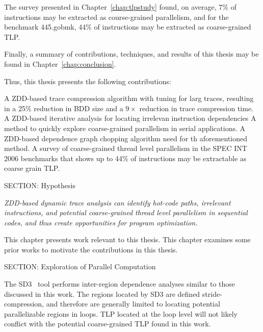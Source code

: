 {The survey presented in Chapter~\ref{chap:tlpstudy} found, on average, 7\% of instructions may be extracted as course-grained parallelism, and for the benchmark 445.gobmk, 44\% of instructions may be extracted as coarse-grained TLP.

Finally, a summary of contributions, techniques, and results of this thesis may be found in Chapter~\ref{chap:conclusion}.

Thus, this thesis presents the following contributions:

 A ZDD-based trace compression algorithm with tuning for larg
 traces, resulting in a 25\% reduction in BDD size and a $9\times$ reduction in trace compression time. A ZDD-based iterative analysis for locating irrelevan
 instruction dependencies A method to quickly explore coarse-grained parallelism in serial
 applications. A ZDD-based dependence graph chopping algorithm need for th
 aforementioned method. A survey of coarse-grained thread level parallelism in the SPEC
 INT 2006 benchmarks that shows up to 44\% of instructions may be extractable as coarse grain TLP.

SECTION: Hypothesis


\emph{ZDD-based dynamic trace analysis can identify hot-code paths, irrelevant instructions, and potential coarse-grained thread level parallelism in sequential codes, and thus create opportunities for program optimization.}


This chapter presents work relevant to this thesis. This chapter examines some prior works to motivate the contributions in this thesis.

SECTION: Exploration of Parallel Computation


The SD3~\cite{minjang:10:micro} tool performs inter-region dependence analyses similar to those discussed in this work.  The regions located by SD3 are defined stride-compression, and therefore are generally limited to locating potential parallelizable regions in loops.  TLP located at the loop level will not likely conflict with the potential coarse-grained TLP found in this work.

}
